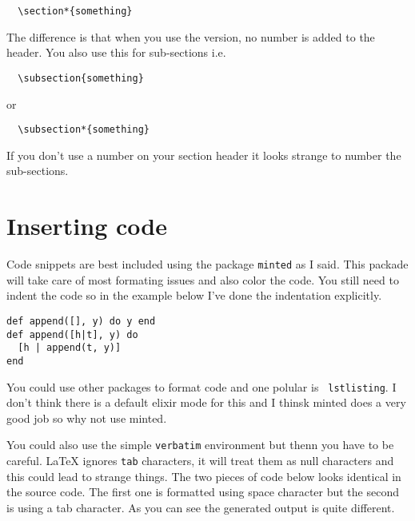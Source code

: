 \documentclass[a4paper,11pt]{article}
\begin{document}
\begin{verbatim}
  \section*{something}
\end{verbatim}

The difference is that when you use the {\tt *} version, no number is
added to the header. You also use this for sub-sections i.e.

\begin{verbatim}
  \subsection{something}
\end{verbatim}

or

\begin{verbatim}
  \subsection*{something}
\end{verbatim}

If you don't use a number on your section header it looks strange to
number the sub-sections.

\section*{Inserting code}

Code snippets are best included using the package {\tt minted} as I
said. This packade will take care of most formating issues and also
color the code. You still need to indent the code so in the example
below I've done the indentation explicitly.

\begin{verbatim}
def append([], y) do y end
def append([h|t], y) do
  [h | append(t, y)]
end
\end{verbatim}

You could use other packages to format code and one polular is {\tt
  lstlisting}. I don't think there is a default elixir mode for this
and I thinsk minted does a very good job so why not use minted. 

You could also use the simple {\tt verbatim} environment but thenn you
have to be careful. LaTeX ignores {\tt tab} characters, it will treat
them as null characters and this could lead to strange things. The two
pieces of code below looks identical in the source code. The first one
is formatted using space character but the second is using a tab
character. As you can see the generated output is quite different.
\end{document}
